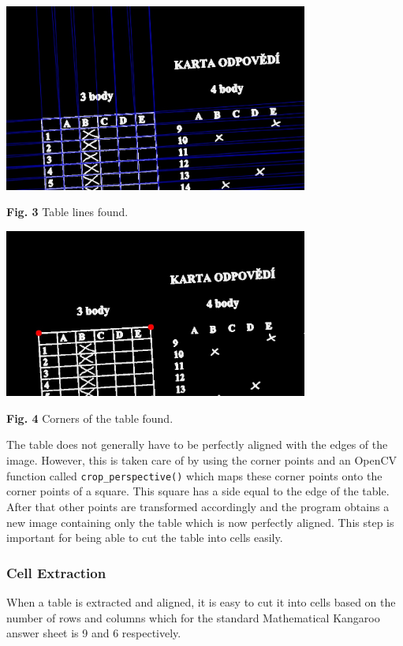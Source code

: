 \documentclass{article}
\begin{document}
{{{		\begin{center}
			\includegraphics[width=10cm]{04.jpg} \par
			{\bf Fig. 3} Table lines found. \par
		\end{center}

		\begin{center}
			\includegraphics[width=10cm]{03.jpg} \par
			{\bf Fig. 4} Corners of the table found. \par
		\end{center}

		The table does not generally have to be perfectly aligned with the edges of the image. However, this is taken care of by using the corner points and an OpenCV function called \verb+crop_perspective()+ which maps these corner points onto the corner points of a square. This square has a side equal to the edge of the table. After that other points are transformed accordingly and the program obtains a new image containing only the table which is now perfectly aligned. This step is important for being able to cut the table into cells easily.
		}

		\subsubsection{Cell Extraction}{
		When a table is extracted and aligned, it is easy to cut it into cells based on the number of rows and columns which for the standard Mathematical Kangaroo answer sheet is 9 and 6 respectively.

}}}
\end{document}
